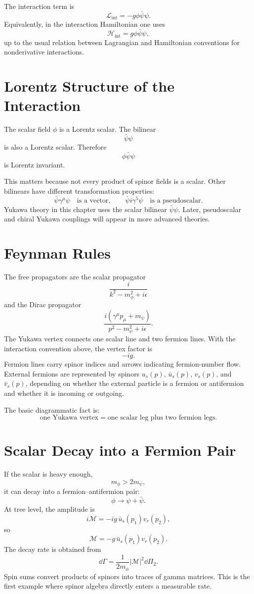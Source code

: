 The interaction term is
\[
    \mathcal{L}_{\mathrm{int}}=-g\phi\bar\psi\psi.
\]
Equivalently, in the interaction Hamiltonian one uses
\[
    \mathcal{H}_{\mathrm{int}}=g\phi\bar\psi\psi,
\]
up to the usual relation between Lagrangian and Hamiltonian conventions for
nonderivative interactions.

\section{Lorentz Structure of the Interaction}

The scalar field \(\phi\) is a Lorentz scalar. The bilinear
\[
    \bar\psi\psi
\]
is also a Lorentz scalar. Therefore
\[
    \phi\bar\psi\psi
\]
is Lorentz invariant.

This matters because not every product of spinor fields is a scalar. Other
bilinears have different transformation properties:
\[
    \bar\psi\gamma^\mu\psi
    \quad \text{is a vector},
    \qquad
    \bar\psi i\gamma^5\psi
    \quad \text{is a pseudoscalar}.
\]
Yukawa theory in this chapter uses the scalar bilinear \(\bar\psi\psi\). Later,
pseudoscalar and chiral Yukawa couplings will appear in more advanced theories.

\section{Feynman Rules}

The free propagators are the scalar propagator
\[
    \frac{i}{k^2-m_\phi^2+i\epsilon}
\]
and the Dirac propagator
\[
    \frac{i(\gamma^\mu p_\mu+m_\psi)}{p^2-m_\psi^2+i\epsilon}.
\]
The Yukawa vertex connects one scalar line and two fermion lines. With the
interaction convention above, the vertex factor is
\[
    -ig.
\]
Fermion lines carry spinor indices and arrows indicating fermion-number flow.
External fermions are represented by spinors \(u_s(p)\), \(\bar u_s(p)\),
\(v_s(p)\), and \(\bar v_s(p)\), depending on whether the external particle is a
fermion or antifermion and whether it is incoming or outgoing.

The basic diagrammatic fact is:
\[
    \text{one Yukawa vertex} = \text{one scalar leg plus two fermion legs}.
\]

\section{Scalar Decay into a Fermion Pair}

If the scalar is heavy enough,
\[
    m_\phi>2m_\psi,
\]
it can decay into a fermion--antifermion pair:
\[
    \phi\longrightarrow \psi+\bar\psi.
\]
At tree level, the amplitude is
\[
    i\mathcal{M}=-ig\,\bar u_s(p_1)v_r(p_2),
\]
so
\[
    \mathcal{M}=-g\,\bar u_s(p_1)v_r(p_2).
\]
The decay rate is obtained from
\[
    \dd\Gamma
    = \frac{1}{2m_\phi}|\mathcal{M}|^2\dd\Pi_2.
\]
Spin sums convert products of spinors into traces of gamma matrices. This is the
first example where spinor algebra directly enters a measurable rate.

